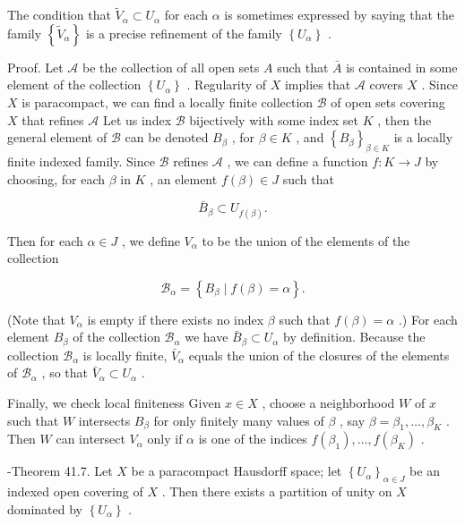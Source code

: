 The condition that \({\widetilde{V}}_{\alpha } \subset  {U}_{\alpha }\) for each \(\alpha\) is sometimes expressed by saying that the family \(\left\{  {\widetilde{V}}_{\alpha }\right\}\) is a precise refinement of the family \(\left\{  {U}_{\alpha }\right\}\) .

Proof. Let \(\mathcal{A}\) be the collection of all open sets \(A\) such that \(\bar{A}\) is contained in some element of the collection \(\left\{  {U}_{\alpha }\right\}\) . Regularity of \(X\) implies that \(\mathcal{A}\) covers \(X\) . Since \(X\) is paracompact, we can find a locally finite collection \(\mathcal{B}\) of open sets covering \(X\) that refines \(\mathcal{A}\) Let us index \(\mathcal{B}\) bijectively with some index set \(K\) , then the general element of \(\mathcal{B}\) can be denoted \({B}_{\beta }\) , for \(\beta  \in  K\) , and \({\left\{  {B}_{\beta }\right\}  }_{\beta  \in  K}\) is a locally finite indexed family. Since \(\mathcal{B}\) refines \(\mathcal{A}\) , we can define a function \(f : K \rightarrow  J\) by choosing, for each \(\beta\) in \(K\) , an element \(f\left( \beta \right)  \in  J\) such that

\[
{\bar{B}}_{\beta } \subset  {U}_{f\left( \beta \right) }.
\]

Then for each \(\alpha  \in  J\) , we define \({V}_{\alpha }\) to be the union of the elements of the collection

\[
{\mathcal{B}}_{\alpha } = \left\{  {{B}_{\beta } \mid  f\left( \beta \right)  = \alpha }\right\}  .
\]

(Note that \({V}_{\alpha }\) is empty if there exists no index \(\beta\) such that \(f\left( \beta \right)  = \alpha\) .) For each element \({B}_{\beta }\) of the collection \({\mathcal{B}}_{\alpha }\) we have \({\bar{B}}_{\beta } \subset  {U}_{\alpha }\) by definition. Because the collection \({\mathcal{B}}_{\alpha }\) is locally finite, \({\bar{V}}_{\alpha }\) equals the union of the closures of the elements of \({\mathcal{B}}_{\alpha }\) , so that \({\bar{V}}_{\alpha } \subset  {U}_{\alpha }\) .

Finally, we check local finiteness Given \(x \in  X\) , choose a neighborhood \(W\) of \(x\) such that \(W\) intersects \({B}_{\beta }\) for only finitely many values of \(\beta\) , say \(\beta  = {\beta }_{1},\ldots ,{\beta }_{K}\) . Then \(W\) can intersect \({V}_{\alpha }\) only if \(\alpha\) is one of the indices \(f\left( {\beta }_{1}\right) ,\ldots ,f\left( {\beta }_{K}\right)\) .

-Theorem 41.7. Let \(X\) be a paracompact Hausdorff space; let \({\left\{  {U}_{\alpha }\right\}  }_{\alpha  \in  J}\) be an indexed open covering of \(X\) . Then there exists a partition of unity on \(X\) dominated by \(\left\{  {U}_{\alpha }\right\}\) .

